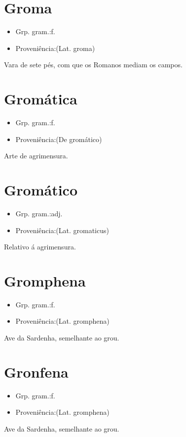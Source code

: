 \section{Groma}
\begin{itemize}
\item {Grp. gram.:f.}
\end{itemize}
\begin{itemize}
\item {Proveniência:(Lat. \textunderscore groma\textunderscore )}
\end{itemize}
Vara de sete pés, com que os Romanos mediam os campos.
\section{Gromática}
\begin{itemize}
\item {Grp. gram.:f.}
\end{itemize}
\begin{itemize}
\item {Proveniência:(De \textunderscore gromático\textunderscore )}
\end{itemize}
Arte de agrimensura.
\section{Gromático}
\begin{itemize}
\item {Grp. gram.:adj.}
\end{itemize}
\begin{itemize}
\item {Proveniência:(Lat. \textunderscore gromaticus\textunderscore )}
\end{itemize}
Relativo á agrimensura.
\section{Gromphena}
\begin{itemize}
\item {Grp. gram.:f.}
\end{itemize}
\begin{itemize}
\item {Proveniência:(Lat. \textunderscore gromphena\textunderscore )}
\end{itemize}
Ave da Sardenha, semelhante ao grou.
\section{Gronfena}
\begin{itemize}
\item {Grp. gram.:f.}
\end{itemize}
\begin{itemize}
\item {Proveniência:(Lat. \textunderscore gromphena\textunderscore )}
\end{itemize}
Ave da Sardenha, semelhante ao grou.
